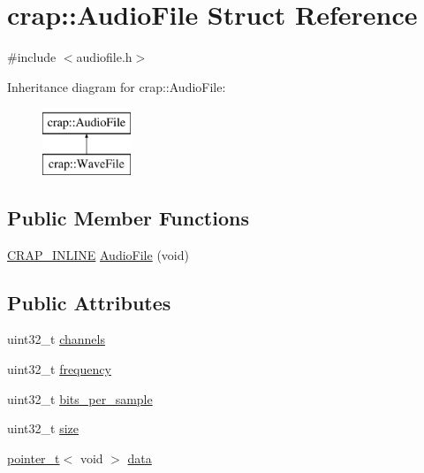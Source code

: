 \hypertarget{structcrap_1_1_audio_file}{\section{crap\+:\+:Audio\+File Struct Reference}
\label{structcrap_1_1_audio_file}
}


{\ttfamily \#include $<$audiofile.\+h$>$}

Inheritance diagram for crap\+:\+:Audio\+File\+:\begin{figure}[H]
\begin{center}
\leavevmode
\includegraphics[height=2.000000cm]{structcrap_1_1_audio_file}
\end{center}
\end{figure}
\subsection*{Public Member Functions}
\begin{DoxyCompactItemize}
\item 
\hyperlink{config__x86_8h_a5a40526b8d842e7ff731509998bb0f1c}{C\+R\+A\+P\+\_\+\+I\+N\+L\+I\+N\+E} \hyperlink{structcrap_1_1_audio_file_aeae5293f38a1e00a3d3e48028d724cd3}{Audio\+File} (void)
\end{DoxyCompactItemize}
\subsection*{Public Attributes}
\begin{DoxyCompactItemize}
\item 
uint32\+\_\+t \hyperlink{structcrap_1_1_audio_file_a78b93f01a2e9b481371ef7c64b7fabb4}{channels}
\item 
uint32\+\_\+t \hyperlink{structcrap_1_1_audio_file_ae5c7beff491714d262eea53b7760f1a2}{frequency}
\item 
uint32\+\_\+t \hyperlink{structcrap_1_1_audio_file_aa5ea8a9d1a5c7d7f04b93f5832f2ae5b}{bits\+\_\+per\+\_\+sample}
\item 
uint32\+\_\+t \hyperlink{structcrap_1_1_audio_file_ad5c536e16fbd38393346b0bc2c7ba099}{size}
\item 
\hyperlink{structcrap_1_1pointer__t}{pointer\+\_\+t}$<$ void $>$ \hyperlink{structcrap_1_1_audio_file_a0c75cc1dfed89dc59fb3868cdf2a8b2e}{data}
\end{DoxyCompactItemize}


